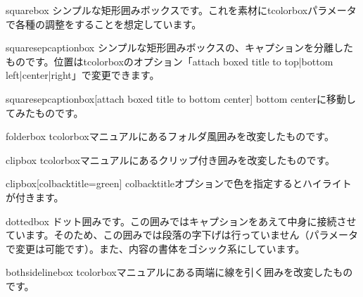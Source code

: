 \begin{rv@squarebox@caption}{squarebox}
シンプルな矩形囲みボックスです。これを素材にtcolorboxパラメータで各種の調整をすることを想定しています。
\end{rv@squarebox@caption}

\begin{rv@squaresepcaptionbox@caption}{squaresepcaptionbox}
シンプルな矩形囲みボックスの、キャプションを分離したものです。位置はtcolorboxのオプション「attach boxed title to top|bottom left|center|right」で変更できます。
\end{rv@squaresepcaptionbox@caption}

\begin{rv@squaresepcaptionbox@caption}{squaresepcaptionbox}[attach boxed title to bottom center]
bottom centerに移動してみたものです。
\end{rv@squaresepcaptionbox@caption}

\begin{rv@folderbox@caption}{folderbox}
tcolorboxマニュアルにあるフォルダ風囲みを改変したものです。
\end{rv@folderbox@caption}


\begin{rv@clipbox@caption}{clipbox}
tcolorboxマニュアルにあるクリップ付き囲みを改変したものです。
\end{rv@clipbox@caption}

\begin{rv@clipbox@caption}{clipbox}[colbacktitle=green]
colbacktitleオプションで色を指定するとハイライトが付きます。
\end{rv@clipbox@caption}


\begin{rv@dottedbox@caption}{dottedbox}
ドット囲みです。この囲みではキャプションをあえて中身に接続させています。そのため、この囲みでは段落の字下げは行っていません（パラメータで変更は可能です）。また、内容の書体をゴシック系にしています。
\end{rv@dottedbox@caption}

\begin{rv@bothsidelinebox@caption}{bothsidelinebox}
tcolorboxマニュアルにある両端に線を引く囲みを改変したものです。
\end{rv@bothsidelinebox@caption}

